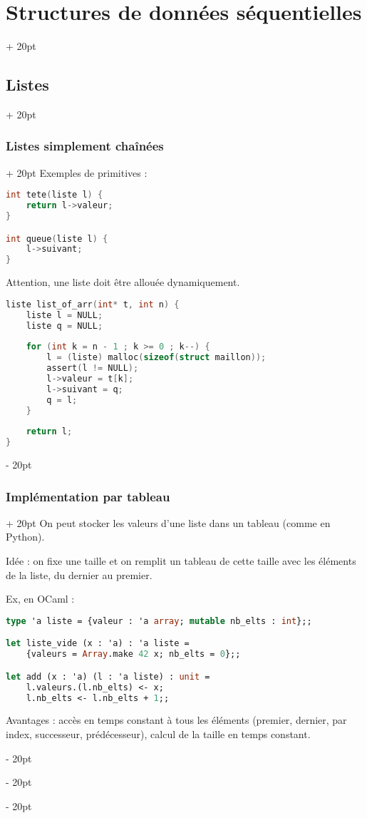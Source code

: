 \documentclass[a4paper, 12pt, twoside]{article}
\newcommand{\ind}[1][20pt]{\advance\leftskip + #1}
\newcommand{\deind}[1][20pt]{\advance\leftskip - #1}
\newenvironment{indt}[2][20pt]{#2 \par \ind[#1]}{\par \deind} %
\begin{document}
\begin{indt}{\section{Structures de données séquentielles}}
\begin{indt}{\subsection{Listes}}
\begin{indt}{\subsubsection{Listes simplement chaînées}}
                Exemples de primitives :
                
                \begin{lstlisting}[language=C, xleftmargin=80pt]
int tete(liste l) {
    return l->valeur;
}

int queue(liste l) {
    l->suivant;
}\end{lstlisting}
                
                Attention, une liste doit être allouée dynamiquement.
                
                \begin{lstlisting}[language=C, xleftmargin=80pt]
liste list_of_arr(int* t, int n) {
    liste l = NULL;
    liste q = NULL;
    
    for (int k = n - 1 ; k >= 0 ; k--) {
        l = (liste) malloc(sizeof(struct maillon));
        assert(l != NULL);
        l->valeur = t[k];
        l->suivant = q;
        q = l;
    }
    
    return l;
}\end{lstlisting}
            \end{indt}
            
            \vspace{6pt}
            
            \begin{indt}{\subsubsection{Implémentation par tableau}}
                On peut stocker les valeurs d'une liste dans un tableau (comme en Python).
                
                Idée : on fixe une taille et on remplit un tableau de cette taille avec les éléments de la liste, du dernier au premier.
                
                Ex, en OCaml :
                \begin{lstlisting}[language=Caml, xleftmargin=80pt]
type 'a liste = {valeur : 'a array; mutable nb_elts : int};;

let liste_vide (x : 'a) : 'a liste =
    {valeurs = Array.make 42 x; nb_elts = 0};;

let add (x : 'a) (l : 'a liste) : unit =
    l.valeurs.(l.nb_elts) <- x;
    l.nb_elts <- l.nb_elts + 1;;\end{lstlisting}
                
                Avantages : accès en temps constant à tous les éléments (premier, dernier, par index, successeur, prédécesseur), calcul de la taille en temps constant.
                

\end{indt}
\end{indt}
\end{indt}
\end{document}
